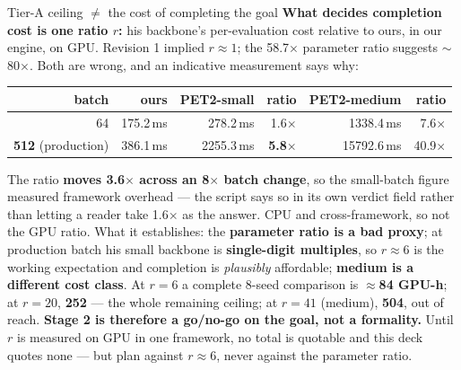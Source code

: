 \documentclass[aspectratio=169,10pt]{beamer}
\newcommand{\warn}[1]{\textcolor{warn}{#1}}
\begin{document}
\begin{frame}[t]{Tier-A ceiling $\ne$ the cost of completing the goal}
  \vspace{0.2em}
  {\scriptsize \textbf{What decides completion cost is one ratio $r$:} his backbone's
  per-evaluation cost relative to ours, in our engine, on GPU. Revision 1 implied
  $r\approx1$; the 58.7$\times$ parameter ratio suggests $\sim$80$\times$.
  \warn{Both are wrong}, and an indicative measurement says why:}
  \vspace{0.1em}

  \begin{center}\scriptsize
  \begin{tabular}{@{}rrrrrr@{}}
    \toprule
    \textbf{batch} & \textbf{ours} & \textbf{PET2-small} & \textbf{ratio} &
      \textbf{PET2-medium} & \textbf{ratio} \\
    \midrule
    64 & 175.2\,ms & 278.2\,ms & 1.6$\times$ & 1338.4\,ms & 7.6$\times$ \\
    \textbf{512} (production) & 386.1\,ms & 2255.3\,ms & \textbf{5.8$\times$} &
      15792.6\,ms & 40.9$\times$ \\
    \bottomrule
  \end{tabular}
  \end{center}
  \vspace{0.1em}
  {\scriptsize The ratio \textbf{moves 3.6$\times$ across an 8$\times$ batch change}, so the
  small-batch figure measured framework overhead --- the script says so in its own verdict
  field rather than letting a reader take 1.6$\times$ as the answer. CPU and
  \warn{cross-framework}, so \warn{not the GPU ratio}. What it establishes: the
  \textbf{parameter ratio is a bad proxy}; at production batch his small backbone is
  \textbf{single-digit multiples}, so $r\approx6$ is the working expectation and
  completion is \emph{plausibly} affordable; \textbf{medium is a different cost class}.}
  \vspace{0.3em}
  {\scriptsize At $r=6$ a complete 8-seed comparison is $\approx$\textbf{84 GPU-h}; at
  $r=20$, \textbf{252} --- the whole remaining ceiling; at $r=41$ (medium), \textbf{504},
  \warn{out of reach}. \textbf{Stage 2 is therefore a go/no-go on the goal, not a
  formality.} Until $r$ is measured on GPU in one framework, no total is quotable and
  this deck quotes none --- but plan against $r\approx6$, never against the parameter
  ratio.}
\end{frame}
\end{document}
